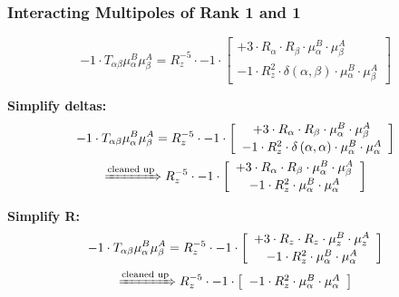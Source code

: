 \documentclass{article}
\begin{document}
\subsubsection{Interacting Multipoles of Rank 1 and 1}
\begin{equation}
- 1 \cdot T_{\alpha{}\beta{}} \mu{}^{B}_{\alpha{}} \mu{}^{A}_{\beta{}} = R_{z}^{-5} \cdot -1 \cdot  \left[ \begin{array}{c} 
 		+ 3 \cdot R_{\alpha{}} \cdot R_{\beta{}} \cdot \mu{}^{B}_{\alpha{}} \cdot \mu{}^{A}_{\beta{}} 
 \\[0.2em] 		 - 1 \cdot R_{z}^{2} \cdot \delta{}\left(\alpha{}, \beta{}\right) \cdot \mu{}^{B}_{\alpha{}} \cdot \mu{}^{A}_{\beta{}}
 \end{array}\right] 
\end{equation}


\textbf{Simplify deltas:}
\begin{subequations}\begin{gather}
- 1 \cdot T_{\alpha{}\beta{}} \mu{}^{B}_{\alpha{}} \mu{}^{A}_{\beta{}} = R_{z}^{-5} \cdot -1 \cdot  \left[ \begin{array}{c} 
 		+ 3 \cdot R_{\alpha{}} \cdot R_{\beta{}} \cdot \mu{}^{B}_{\alpha{}} \cdot \mu{}^{A}_{\beta{}} 
 \\[0.2em] 		 - 1 \cdot R_{z}^{2} \cdot \delta{}\left(\alpha{}, \alpha{}\right) \cdot \mu{}^{B}_{\alpha{}} \cdot \mu{}^{A}_{\alpha{}}
 \end{array}\right] 
\\ \xRightarrow{\text{cleaned up}}
 R_{z}^{-5} \cdot -1 \cdot  \left[ \begin{array}{c} 
 		+ 3 \cdot R_{\alpha{}} \cdot R_{\beta{}} \cdot \mu{}^{B}_{\alpha{}} \cdot \mu{}^{A}_{\beta{}} 
 \\[0.2em] 		 - 1 \cdot R_{z}^{2} \cdot \mu{}^{B}_{\alpha{}} \cdot \mu{}^{A}_{\alpha{}}
 \end{array}\right] 
\end{gather}\end{subequations}


\textbf{Simplify R:}
\begin{subequations}\begin{gather}
- 1 \cdot T_{\alpha{}\beta{}} \mu{}^{B}_{\alpha{}} \mu{}^{A}_{\beta{}} = R_{z}^{-5} \cdot -1 \cdot  \left[ \begin{array}{c} 
 		+ 3 \cdot R_{z} \cdot R_{z} \cdot \mu{}^{B}_{z} \cdot \mu{}^{A}_{z} 
 \\[0.2em] 		 - 1 \cdot R_{z}^{2} \cdot \mu{}^{B}_{\alpha{}} \cdot \mu{}^{A}_{\alpha{}}
 \end{array}\right] 
\\ \xRightarrow{\text{cleaned up}}
 R_{z}^{-5} \cdot -1 \cdot  \left[ \begin{array}{c} 
 		- 1 \cdot R_{z}^{2} \cdot \mu{}^{B}_{\alpha{}} \cdot \mu{}^{A}_{\alpha{}}
 \end{array}\right] 
\end{gather}\end{subequations}
\end{document}
